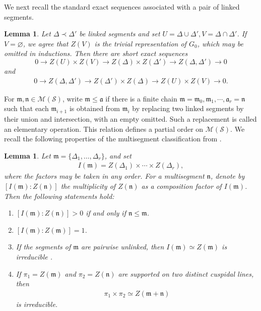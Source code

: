 \documentclass[11pt,leqno]{amsart}
\numberwithin{equation}{section}
\theoremstyle{plain}
\newtheorem{lemma}[theorem]{Lemma}
\theoremstyle{definition}
\theoremstyle{remark}
\begin{document}
	We next recall the standard exact sequences associated with a pair of
	linked segments. 
	\begin{lemma}\cite[Lemma 5.12]{MS13}\label{prop:linked-ses}
		Let $\Delta\prec\Delta'$ be linked segments and set $U=\Delta\cup\Delta', V=\Delta\cap\Delta'$. 
		If $V=\varnothing$, we agree that $Z(V)$ is the trivial representation of $G_0$, which may be omitted in inductions. 
		Then there are short exact sequences
		\begin{equation}\label{exacta}
			0\longrightarrow Z(U)\times Z(V)\longrightarrow Z(\Delta)\times Z(\Delta')\longrightarrow Z(\Delta,\Delta')\longrightarrow0 
		\end{equation}
		and
		\begin{align}\label{exactb}
			0\longrightarrow Z(\Delta,\Delta')\longrightarrow Z(\Delta')\times Z(\Delta)\longrightarrow Z(U)\times Z(V)\longrightarrow 0. 
		\end{align}
	\end{lemma}
	For $\mathfrak m, \mathfrak  n \in\mathcal M(\mathcal S)$, write $\mathfrak m \leq \mathfrak a$ if there is a finite chain $\mathfrak m=\mathfrak m_0, \mathfrak m_1,\cdots, \mathfrak a_r=\mathfrak n$	such that each $\mathfrak m_{i+1}$ is obtained from $\mathfrak m_i$ by replacing two linked segments by their union
	and intersection, with an empty omitted.
	Such a replacement is called an elementary operation.
	This relation defines a partial order on $\mathcal M(\mathcal S)$.	
	We recall the following properties of the multisegment
	classification from \cite{MS13}.
	\begin{lemma}\label{prop:composition-factors}
		Let $\mathfrak m=\{\Delta_1,\ldots,\Delta_r\}$, and set
		\begin{align*}
			I(\mathfrak m)=Z(\Delta_1)\times\cdots\times Z(\Delta_r),
		\end{align*}
		where the factors may be taken in any order.
		For a multisegment $\mathfrak n$, denote by
		$[I(\mathfrak m):Z(\mathfrak n)]$ the multiplicity of
		$Z(\mathfrak n)$ as a composition factor of $I(\mathfrak m)$.
		Then the following statements hold:
		\begin{enumerate}[label=(\roman*)]
			\item
			$[I(\mathfrak m):Z(\mathfrak n)]>0$ if and only if $\mathfrak n\leq\mathfrak m$.
			\item
			$[I(\mathfrak m):Z(\mathfrak m)]=1$.
			\item
			If the segments of $\mathfrak m$ are pairwise unlinked, then $I(\mathfrak m)\simeq Z(\mathfrak m)$ is irreducible .
			\item
			If $\pi_1=Z(\mathfrak m)$ and $\pi_2=Z(\mathfrak n)$ are supported on two distinct cuspidal lines, then
			\begin{align*}
				\pi_1\times\pi_2\simeq Z(\mathfrak m+\mathfrak n)
			\end{align*}
			is irreducible.
		\end{enumerate}
	\end{lemma}
\end{document}
